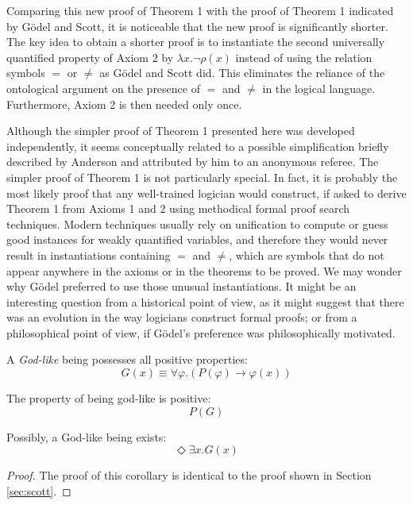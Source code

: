 \documentclass[smallextended]{svjour3}
\newcommand{\imp}{\rightarrow}
\newcommand{\ex}{\exists}
\newcommand{\pos}{\Diamond} %
\begin{document}
Comparing this new proof of Theorem 1 with the proof of Theorem 1 indicated by G\"odel and Scott, it is noticeable that the new proof is significantly shorter. The key idea to obtain a shorter proof is to instantiate the second universally quantified property of Axiom 2 by $\lambda x. \neg \rho(x)$ instead of using the relation symbols $=$ or $\neq$ as G\"odel and Scott did. This eliminates the reliance of the ontological argument on the presence of $=$ and $\neq$ in the logical language. Furthermore, Axiom 2 is then needed only once.

Although the simpler proof of Theorem 1 presented here was developed independently, it seems conceptually related to a possible simplification briefly described by Anderson \citep[footnote 2]{and90} and attributed by him to an anonymous referee. The simpler proof of Theorem 1 is not particularly special. In fact, it is probably the most likely proof that any well-trained logician would construct, if asked to derive Theorem 1 from Axioms 1 and 2 using methodical formal proof search techniques. Modern techniques usually rely on unification to compute or guess good instances for weakly quantified variables, and therefore they would never result in instantiations containing $=$ and $\neq$, which are symbols that do not appear anywhere in the axioms or in the theorems to be proved. We may wonder why G\"odel preferred to use those unusual instantiations. It might be an interesting question from a historical point of view, as it might suggest that there was an evolution in the way logicians construct formal proofs; or from a philosophical point of view, if G\"odel's preference was philosophically motivated.



\begin{definition}
\label{N:D1}
A \emph{God-like} being possesses all positive properties:
$$
G(x) \equiv \forall \varphi. (P(\varphi) \to \varphi(x))
$$
\end{definition}

\begin{axiom}
\label{N:A3}
The property of being god-like is positive:
$$
P(G)
$$
\end{axiom}

\begin{corollary}
\label{N:C1}
Possibly, a God-like being exists:
$$
\pos \ex x. G(x)
$$
\end{corollary}
\begin{proof} The proof of this corollary is identical to the proof shown in Section \ref{sec:scott}.
\end{proof}
\end{document}
